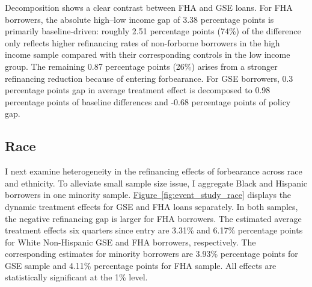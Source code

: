 \documentclass[11pt]{article}
\newcommand{\Javad}[1]{\todo[inline,linecolor=red, backgroundcolor=blue!10!white, bordercolor=red, size=\tiny]{#1}}
\begin{document}
{Decomposition shows a clear contrast between FHA and GSE loans. For FHA borrowers, the absolute high–low income gap of 3.38 percentage points is primarily baseline-driven: roughly 2.51 percentage points (74\%) of the difference only reflects higher refinancing rates of non-forborne borrowers in the high income sample compared with their corresponding controls in the low income group. The remaining 0.87 percentage points (26\%) arises from a stronger refinancing reduction because of entering forbearance. For GSE borrowers, 0.3 percentage points gap in average treatment effect is decomposed to 0.98 percentage points of baseline differences and -0.68 percentage points of policy gap. 



\subsection{Race}
\label{sec:event_study_race}

I next examine heterogeneity in the refinancing effects of forbearance across race and ethnicity. To alleviate small sample size issue, I aggregate Black and Hispanic borrowers in one minority sample.  \hyperref[fig:event_study_race]{Figure~\ref*{fig:event_study_race}} displays the dynamic treatment effects for GSE and FHA loans separately. In both samples, the negative refinancing gap is larger for FHA borrowers. The estimated average treatment effects six quarters since entry are 3.31\% and 6.17\% percentage points for White Non-Hispanic GSE and FHA borrowers, respectively. The corresponding estimates for minority borrowers are 3.93\% percentage points for GSE sample and 4.11\% percentage points for FHA sample. All effects are statistically significant at the 1\% level.

}
\end{document}
